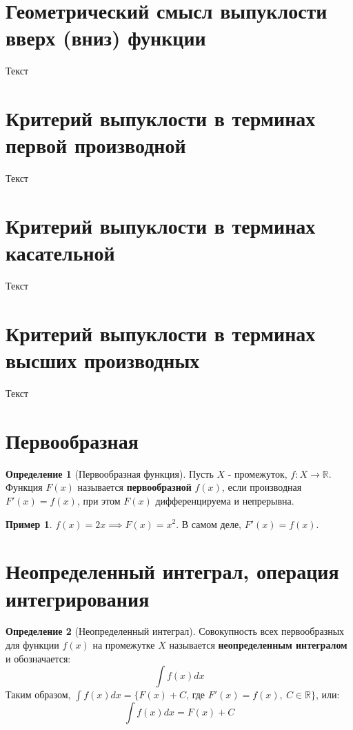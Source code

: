 \documentclass{report}
\theoremstyle{definition}
\newtheorem*{definition}{Определение}
\newtheorem*{example}{Пример}
\begin{document}
\section{Геометрический смысл выпуклости вверх (вниз) функции}
Текст

\section{Критерий выпуклости в терминах первой производной}
Текст

\section{Критерий выпуклости в терминах касательной}
Текст

\section{Критерий выпуклости в терминах высших производных}
Текст

\section{Первообразная}

\begin{definition}[Первообразная функция]
    Пусть \(X\) - промежуток, \(f:X\rightarrow \mathbb{R}\). Функция \(F(x)\) называется
    \textbf{первообразной} \(f(x)\), если производная \(F'(x) = f(x)\), при этом \(F(x)\)
    дифференцируема и непрерывна.
\end{definition}

\begin{example}
    \(f(x) = 2x \implies F(x) = x^{2}\). В самом деле, \(F'(x) = f(x)\).
\end{example}

\section{Неопределенный интеграл, операция интегрирования}

\begin{definition}[Неопределенный интеграл]
    Совокупность всех первообразных для функции \(f(x)\) на промежутке \(X\) называется
    \textbf{неопределенным интегралом} и обозначается:
    \begin{equation*}
        \int f(x) dx
    \end{equation*}
    Таким образом, \(\int f(x) dx = \{F(x) + C\), где \(F'(x) = f(x), \ C \in \mathbb{R}\}\),
    или:
    \begin{equation*}
        \int f(x) dx = F(x) + C
    \end{equation*}
\end{definition}
\end{document}
